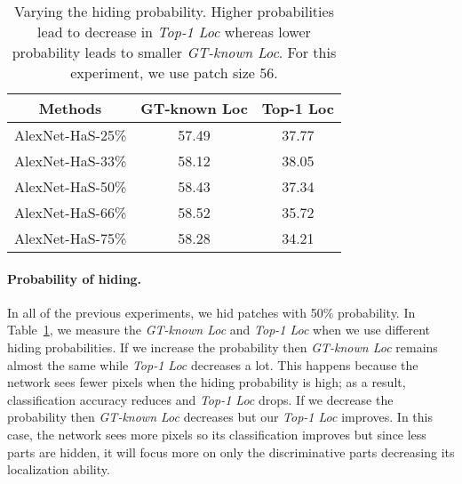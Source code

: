 \begin{table}[t!]
              \begin{center}
                  \footnotesize
                  \begin{tabular}{| c | c | c|}
                  \hline    	
                  Methods & GT-known Loc &  Top-1 Loc\\
                  \hline

                  AlexNet-HaS-25\%            & 57.49 & 37.77  \\
                  AlexNet-HaS-33\%          & 58.12 & 38.05  \\
                  AlexNet-HaS-50\%            & 58.43 & 37.34  \\
                  AlexNet-HaS-66\%            &  58.52  & 35.72  \\
                  AlexNet-HaS-75\%             &  58.28  & 34.21  \\

                  \hline
                   \end{tabular}
                          \caption{Varying the hiding probability. Higher probabilities lead to decrease in \emph{Top-1 Loc} whereas lower probability leads to smaller \emph{GT-known Loc}. For this experiment, we use patch size 56.}
                          \label{table:drop_percent_results}
                          \end{center}
                          \vspace*{-0.13in}
                          \end{table}


\vspace{-10pt}
\paragraph{Probability of hiding.} In all of the previous experiments, we hid patches with 50\% probability. In Table~\ref{table:drop_percent_results}, we measure the \emph{GT-known Loc} and \emph{Top-1 Loc} when we use different hiding probabilities.  If we increase the probability then \emph{GT-known Loc} remains almost the same while \emph{Top-1 Loc} decreases a lot. This happens because the network sees fewer pixels when the hiding probability is high; as a result, classification accuracy reduces and \emph{Top-1 Loc} drops.  If we decrease the probability then \emph{GT-known Loc} decreases but our \emph{Top-1 Loc} improves.  In this case, the network sees more pixels so its classification improves but since less parts are hidden, it will focus more on only the discriminative parts decreasing its localization ability.


